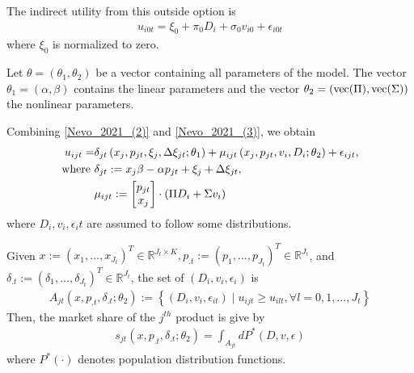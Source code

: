 \documentclass[11pt]{elegantbook}
\begin{document}
The indirect utility from this outside option is
\begin{equation}
    \begin{aligned}
        u_{i0t}=\xi_0+\pi_0 D_i+\sigma_0 v_{i0}+\epsilon_{i0t}
    \end{aligned}
    \nonumber
\end{equation}
where $\xi_0$ is normalized to zero.

Let $\theta=(\theta_1,\theta_2)$ be a vector containing all parameters of the model. The vector $\theta_1=(\alpha,\beta)$ contains the linear parameters and the vector $\theta_2=(\textnormal{vec}(\Pi),\textnormal{vec}(\Sigma))$ the nonlinear parameters.

Combining \eqref{Nevo_2021_(2)} and \eqref{Nevo_2021_(3)}, we obtain
\begin{equation}
    \begin{aligned}
        u_{ijt}=&\delta_{jt}\left(x_j,p_{jt},\xi_j,\Delta\xi_{jt};\theta_1\right)+\mu_{ijt}\left(x_j,p_{jt},v_i,D_i;\theta_2\right)+\epsilon_{ijt},\\
        \textnormal{where }&\delta_{jt}:=x_j\beta - \alpha p_{jt} + \xi_j +\Delta\xi_{jt},\\
        &\mu_{ijt}:=
        \begin{bmatrix}
            p_{jt}\\
            x_j
        \end{bmatrix}\cdot \left(\Pi D_i + \Sigma v_i\right)
    \end{aligned}
    \label{Nevo_2021_(4)}
\end{equation}
where $D_i,v_i,\epsilon_it$ are assumed to follow some distributions.

Given $x:=(x_1,...,x_{J_t})^T\in \mathbb{R}^{J_t\times K}, p_{.t}:=(p_1,...,p_{J_t})^T\in \mathbb{R}^{J_t}$, and $\delta_{.t}:=(\delta_1,...,\delta_{J_t})^T\in \mathbb{R}^{J_t}$, the set of $(D_i,v_i,\epsilon_i)$ is
\begin{equation}
    \begin{aligned}
        A_{jt}\left(x,p_{.t},\delta_{.t};\theta_2\right):=\left\{(D_i,v_i,\epsilon_{it})\mid u_{ijt}\geq u_{ilt},\forall l=0,1,...,J_t\right\}
    \end{aligned}
    \nonumber
\end{equation}
Then, the market share of the $j^{th}$ product is give by
\begin{equation}
    \begin{aligned}
        s_{jt}\left(x,p_{.t},\delta_{.t};\theta_2\right)=\int_{A_{jt}}d P^*(D,v,\epsilon)
    \end{aligned}
    \label{Nevo_2021_(5)}
\end{equation}
where $P^*(\cdot)$ denotes population distribution functions.
\end{document}
